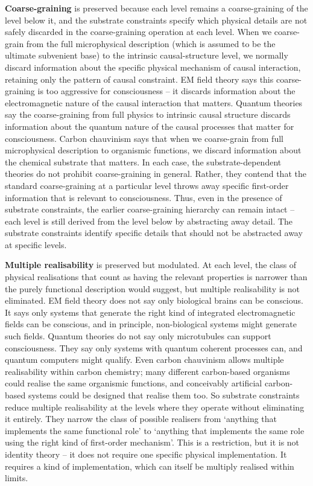 \documentclass[11pt, a4paper, onecolumn, gdm]{google}
\begin{document}
\textbf{Coarse-graining} is preserved because each level remains a coarse-graining of the level below it, and the substrate constraints specify which physical details are not safely discarded in the coarse-graining operation at each level.
When we coarse-grain from the full microphysical description (which is assumed to be the ultimate subvenient base) to the intrinsic causal-structure level, we normally discard information about the specific physical mechanism of causal interaction, retaining only the pattern of causal constraint.
EM field theory says this coarse-graining is too aggressive for consciousness -- it discards information about the electromagnetic nature of the causal interaction that matters.
Quantum theories say the coarse-graining from full physics to intrinsic causal structure discards information about the quantum nature of the causal processes that matter for consciousness.
Carbon chauvinism says that when we coarse-grain from full microphysical description to organismic functions, we discard information about the chemical substrate that matters.
In each case, the substrate-dependent theories do not prohibit coarse-graining in general.
Rather, they contend that the standard coarse-graining at a particular level throws away specific first-order information that is relevant to consciousness.
Thus, even in the presence of substrate constraints, the earlier coarse-graining hierarchy can remain intact -- each level is still derived from the level below by abstracting away detail.
The substrate constraints identify specific details that should not be abstracted away at specific levels.

\textbf{Multiple realisability} is preserved but modulated.
At each level, the class of physical realisations that count as having the relevant properties is narrower than the purely functional description would suggest, but multiple realisability is not eliminated.
EM field theory does not say only biological brains can be conscious.
It says only systems that generate the right kind of integrated electromagnetic fields can be conscious, and in principle, non-biological systems might generate such fields.
Quantum theories do not say only microtubules can support consciousness.
They say only systems with quantum coherent processes can, and quantum computers might qualify.
Even carbon chauvinism allows multiple realisability within carbon chemistry; many different carbon-based organisms could realise the same organismic functions, and conceivably artificial carbon-based systems could be designed that realise them too.
So substrate constraints reduce multiple realisability at the levels where they operate without eliminating it entirely.
They narrow the class of possible realisers from `anything that implements the same functional role' to `anything that implements the same role using the right kind of first-order mechanism'.
This is a restriction, but it is not identity theory -- it does not require one specific physical implementation.
It requires a kind of implementation, which can itself be multiply realised within limits.
\end{document}
